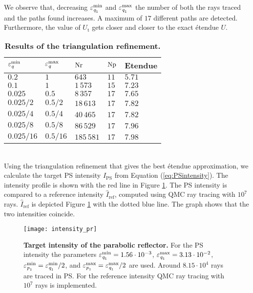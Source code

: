 We observe that, decreasing $\varepsilon_{\textit{q}_1}^{\textrm{min}}$ and $\varepsilon_{\textit{q}_1}^{\textrm{max}}$ the number of both the rays traced and the paths found increases. A maximum of $17$ different paths are detected. Furthermore, the value of $U_{\textrm{t}}$ gets closer and closer to the exact \'{e}tendue $U$.
\begin{table}[t] 
\centering
\caption{\bf Results of the triangulation refinement.}
\begin{tabular}{lllll}
 \hline   $\varepsilon_{\textit{q}}^{\textrm{min}} $  & $\varepsilon_{\textit{q}}^{\textrm{max}}$ & $\textrm{Nr}$ & $\textrm{Np}$ & Etendue \\
  \hline 
 $0.2$ & $1$   & $643$   &  $11$ & $5.71$\\
$0.1$ & $1$   & $1\,573$   &  $15$ & $7.23$\\
$0.025$  & $0.5$    & $8\,357$  & $17$ & $7.65$\\
 $0.025/2$  & $0.5/2$  & $18\,613$   & $17$ & $7.82$\\
$0.025/4$  & $0.5/4$  & $40\,465$   & $17$ & $7.82$\\
 $0.025/8$ & $0.5/8$  & $86\,529$    & $17$ & $7.96$\\
$0.025/16$ & $0.5/16$  & $185\,581$    & $17$ & $7.98$\\
 \hline
 \end{tabular}
 \label{tab:etendue_pr}
 \end{table}
\\ \indent Using the triangulation refinement that gives the best \'{e}tendue approximation, we calculate the target PS intensity $\hat{I}_{\textrm{PS}}$ from Equation (\ref{eq:PSintensity}).
The intensity profile is shown with the red line in Figure \ref{fig:intensity_pr}. The PS intensity is compared to a reference intensity $\hat{I}_{\textrm{ref}}$, computed using QMC ray tracing with $10^7$ rays. $\hat{I}_{\textrm{ref}}$ is depicted Figure \ref{fig:intensity_pr} with the dotted blue line. The graph shows that the two intensities coincide.
 \begin{figure}[t]
  \center
  \texttt{[image: intensity\_pr]}
  \caption{\textbf{Target intensity of the parabolic reflector.} For the PS intensity the parameters $\varepsilon_{\textit{q}_1}^{\textrm{min}}=1.56\cdot 10^{-3}$, $\varepsilon_{\textit{q}_1}^{\textrm{max}}=3.13\cdot 10^{-2}$, $\varepsilon_{\textit{p}_1}^{\textrm{min}}=\varepsilon_{\textit{q}_1}^{\textrm{min}}/2$, and $\varepsilon_{\textit{p}_1}^{\textrm{max}}=\varepsilon_{\textit{q}_1}^{\textrm{max}}/2$ are used. Around $8.15 \cdot 10^{4}$ rays are traced in PS. For the reference intensity QMC ray tracing with $10^7$ rays is implemented.}
  \label{fig:intensity_pr}
\end{figure}
